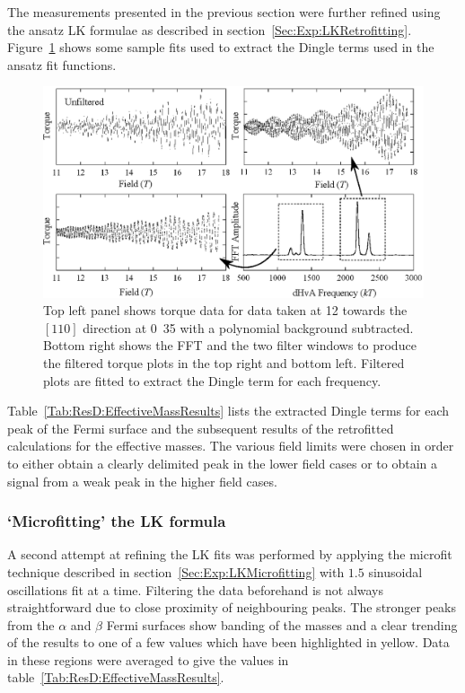 The measurements presented in the previous section were further refined using the ansatz \ac{LK} formulae as described in section~\ref{Sec:Exp:LKRetrofitting}. Figure~\ref{Fig:ResD:DingleTermExtractionFits} shows some sample fits used to extract the Dingle terms used in the ansatz fit functions.
\begin{figure}[htbp]
    \begin{center}
        \includegraphics[scale=0.9]{Chapter-dHvABaFe2P2/Figures/Mass/FittingDingleTerm/FittingDingleTerm}
        \caption{Top left panel shows torque data for data taken at \unit{12}{\degree} towards the $[110]$ direction at \unit{0.35}{\tesla} with a polynomial background subtracted. Bottom right shows the \ac{FFT} and the two filter windows to produce the filtered torque plots in the top right and bottom left. Filtered plots are fitted to extract the Dingle term for each frequency.}
        \label{Fig:ResD:DingleTermExtractionFits}
    \end{center}
\end{figure}
Table~\ref{Tab:ResD:EffectiveMassResults} lists the extracted Dingle terms for each peak of the Fermi surface and the subsequent results of the retrofitted calculations for the effective masses. The various field limits were chosen in order to either obtain a clearly delimited peak in the lower field cases or to obtain a signal from a weak peak in the higher field cases.


\subsubsection{`Microfitting' the \ac{LK} formula}

A second attempt at refining the \ac{LK} fits was performed by applying the microfit technique described in section~\ref{Sec:Exp:LKMicrofitting} with $1.5$ sinusoidal oscillations fit at a time. Filtering the data beforehand is not always straightforward due to close proximity of neighbouring peaks. The stronger peaks from the $\alpha$ and $\beta$ Fermi surfaces show banding of the masses and a clear trending of the results to one of a few values which have been highlighted in yellow. Data in these regions were averaged to give the values in table~\ref{Tab:ResD:EffectiveMassResults}.

